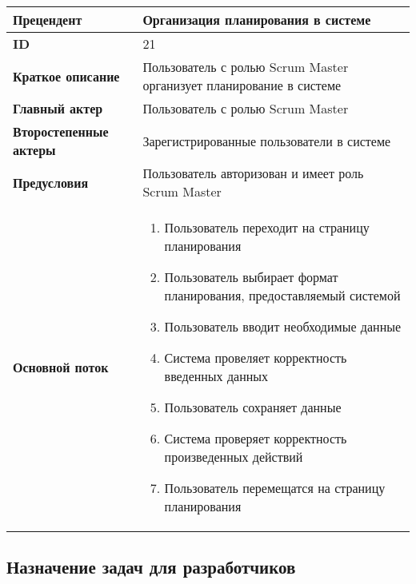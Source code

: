 \documentclass[14pt,a4paper]{extarticle}
\begin{document}
\begin{tabular}{|l|p{9cm}|}
	\hline
	\textbf{Прецендент}            & Организация планирования в системе                                              \\
	\hline
	\textbf{ID}                    & 21                                                                           	 \\
	\hline
	\textbf{Краткое описание}      & Пользователь с ролью Scrum Master организует планирование в системе             \\
	\hline
	\textbf{Главный актер}         & Пользователь с ролью Scrum Master                                               \\
	\hline
	\textbf{Второстепенные актеры} & Зарегистрированные пользователи в системе                                   	 \\
	\hline
	\textbf{Предусловия}           & Пользователь авторизован и имеет роль Scrum Master                              \\
	\hline
	\textbf{Основной поток}        & \begin{enumerate}
		                                 \item Пользователь переходит на страницу планирования
		                                 \item Пользователь выбирает формат планирования, предоставляемый системой
						 \item Пользователь вводит необходимые данные
						 \item Система провеляет корректность введенных данных
					         \item Пользователь сохраняет данные
		                                 \item Система проверяет корректность произведенных действий
						 \item Пользователь перемещатся на страницу планирования
	                                 \end{enumerate} \\
	\hline
\end{tabular}

\subsection{Назначение задач для разработчиков}
\end{document}

